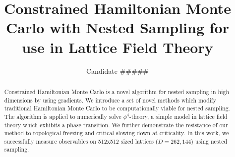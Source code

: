\documentclass[aps,prd,reprint,preprintnumbers,showpacs,floatfix,nofootinbib,superscript address]{revtex4-2}
\begin{document}
\title{Constrained Hamiltonian Monte Carlo with Nested Sampling for use in Lattice Field Theory}

\author{Candidate \#\#\#\#\#}

\begin{abstract}
     Constrained Hamiltonian Monte Carlo is a novel algorithm for nested sampling in high dimensions by using gradients.
     We introduce a set of novel methods which modify traditional Hamiltonian Monte Carlo to be computationally viable for
     nested sampling.
     The algorithm is applied to numerically solve $\phi^4$-theory, a simple model in lattice field theory which
     exhibits a phase transition.
     We further demonstrate the resistance of our method to topological freezing and critical slowing down at criticality.
     In this work, we successfully measure observables on 512x512 sized lattices ($D=262,144$) using nested sampling.
\end{abstract}


\maketitle

























\end{document}
